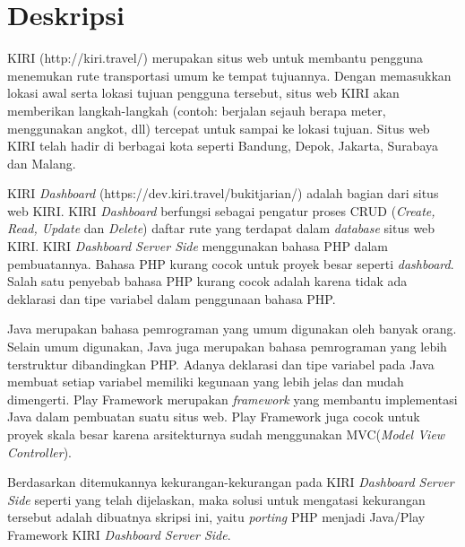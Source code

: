 \documentclass[a4paper,twoside]{article}
\begin{document}
\title{\@judultopik}
\author{\nama \textendash \@npm} 

\newcommand{\nama}{Tommy Adhitya The}
\newcommand{\@npm}{2012730031}
\newcommand{\@judultopik}{\textit{Porting} PHP menjadi Java/Play Framework. Studi Kasus: KIRI \textit{Dashboard Server Side}} %
\newcommand{\jumpemb}{1} %
\newcommand{\tanggal}{11/09/2015}
\maketitle


\section{Deskripsi}
KIRI (http://kiri.travel/) merupakan situs web untuk membantu pengguna menemukan rute transportasi umum ke tempat tujuannya. Dengan memasukkan lokasi awal serta lokasi tujuan pengguna tersebut, situs web KIRI akan memberikan langkah-langkah (contoh: berjalan sejauh berapa meter, menggunakan angkot, dll) tercepat untuk sampai ke lokasi tujuan. Situs web KIRI telah hadir di berbagai kota seperti Bandung, Depok, Jakarta, Surabaya dan Malang.

KIRI \textit{Dashboard} (https://dev.kiri.travel/bukitjarian/) adalah bagian dari situs web KIRI. KIRI \textit{Dashboard} berfungsi sebagai pengatur proses CRUD (\textit{Create, Read, Update} dan \textit{Delete}) daftar rute yang terdapat dalam \textit{database} situs web KIRI. KIRI \textit{Dashboard Server Side} menggunakan bahasa PHP dalam pembuatannya. Bahasa PHP kurang cocok untuk proyek besar seperti \textit{dashboard}. Salah satu penyebab bahasa PHP kurang cocok adalah karena tidak ada deklarasi dan tipe variabel dalam penggunaan bahasa PHP.

Java merupakan bahasa pemrograman yang umum digunakan oleh banyak orang. Selain umum digunakan, Java juga merupakan bahasa pemrograman yang lebih terstruktur dibandingkan PHP. Adanya deklarasi dan tipe variabel pada Java membuat setiap variabel memiliki kegunaan yang lebih jelas dan mudah dimengerti. Play Framework merupakan \textit{framework} yang membantu implementasi Java dalam pembuatan suatu situs web. Play Framework juga cocok untuk proyek skala besar karena arsitekturnya sudah menggunakan MVC(\textit{Model View Controller}).

Berdasarkan ditemukannya kekurangan-kekurangan pada KIRI \textit{Dashboard Server Side} seperti yang telah dijelaskan, maka solusi untuk mengatasi kekurangan tersebut adalah dibuatnya skripsi ini, yaitu \textit{porting} PHP menjadi Java/Play Framework KIRI \textit{Dashboard Server Side}.
\end{document}
